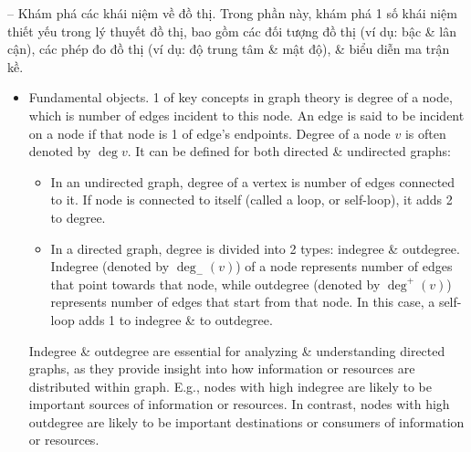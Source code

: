\documentclass{article}
\begin{document}
\begin{itemize}
\begin{itemize}
        -- {\sf Khám phá các khái niệm về đồ thị.} Trong phần này, khám phá 1 số khái niệm thiết yếu trong lý thuyết đồ thị, bao gồm các đối tượng đồ thị (ví dụ: bậc \& lân cận), các phép đo đồ thị (ví dụ: độ trung tâm \& mật độ), \& biểu diễn ma trận kề.
        \begin{itemize}
            \item {\sf Fundamental objects.} 1 of key concepts in graph theory is degree of a node, which is number of edges incident to this node. An edge is said to be incident on a node if that node is 1 of edge's endpoints. Degree of a node $v$ is often denoted by $\deg v$. It can be defined for both directed \& undirected graphs:
            \begin{itemize}
                \item In an undirected graph, degree of a vertex is number of edges connected to it. If node is connected to itself (called a loop, or self-loop), it adds 2 to degree.
                \item In a directed graph, degree is divided into 2 types: indegree \& outdegree. Indegree (denoted by $\deg_-(v)$) of a node represents number of edges that point towards that node, while outdegree (denoted by $\deg^+(v)$) represents number of edges that start from that node. In this case, a self-loop adds 1 to indegree \& to outdegree.
            \end{itemize}
            Indegree \& outdegree are essential for analyzing \& understanding directed graphs, as they provide insight into how information or resources are distributed within graph. E.g., nodes with high indegree are likely to be important sources of information or resources. In contrast, nodes with high outdegree are likely to be important destinations or consumers of information or resources.


\end{itemize}
\end{itemize}
\end{itemize}
\end{document}
